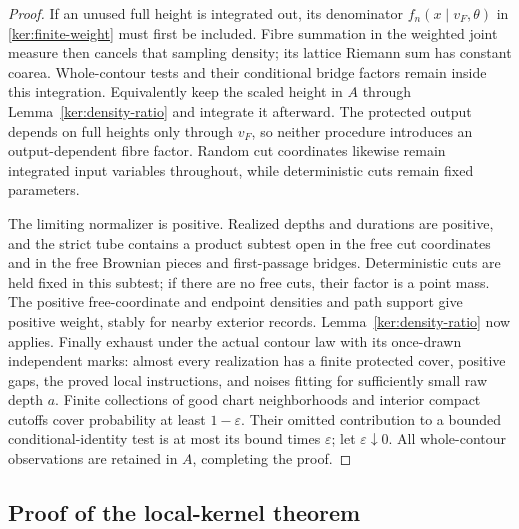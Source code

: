 \documentclass[11pt]{article}
\numberwithin{equation}{section}
\theoremstyle{definition}
\theoremstyle{remark}
\newcommand{\1}{\mathbf 1}
\begin{document}
\begin{proof}
If an unused full height is integrated out, its denominator
\(f_n(x\mid v_F,\theta)\) in \eqref{ker:finite-weight} must first be
included.  Fibre summation in the weighted joint measure then cancels
that sampling density; its lattice Riemann sum has constant coarea.
Whole-contour tests and their conditional bridge factors remain
inside this integration.  Equivalently keep the scaled height in
\(A\) through Lemma~\ref{ker:density-ratio} and integrate it afterward.
The protected output depends on full heights only through \(v_F\),
so neither procedure introduces an output-dependent fibre factor.
Random cut coordinates likewise remain integrated input variables
throughout, while deterministic cuts remain fixed parameters.

The limiting normalizer is positive. Realized depths and durations
are positive, and the strict tube contains a product subtest open
in the free cut coordinates and in the free Brownian pieces and
first-passage bridges. Deterministic cuts are held fixed in this
subtest; if there are no free cuts, their factor is a point mass.
The positive free-coordinate and endpoint densities and path support
give positive weight, stably for nearby exterior records.
Lemma~\ref{ker:density-ratio} now applies.
Finally exhaust under the actual contour law with its once-drawn
independent marks: almost every realization has a finite protected
cover, positive gaps, the proved local instructions, and noises fitting
for sufficiently small raw depth \(a\).  Finite collections of good
chart neighborhoods and interior compact cutoffs cover probability
at least \(1-\varepsilon\).  Their omitted contribution to a bounded
conditional-identity test is at most its bound times
\(\varepsilon\); let \(\varepsilon\downarrow0\).
All whole-contour observations are retained in \(A\), completing the
proof.
\end{proof}


\subsection{Proof of the local-kernel theorem}
\end{document}
